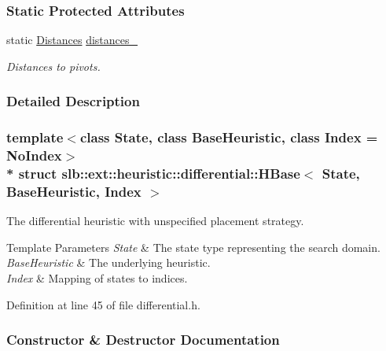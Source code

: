\subsubsection*{Static Protected Attributes}
\begin{DoxyCompactItemize}
\item 
static \hyperlink{structslb_1_1ext_1_1heuristic_1_1differential_1_1HBase_a616a127e34765bea6c069fc3faa4aafb}{Distances} \hyperlink{structslb_1_1ext_1_1heuristic_1_1differential_1_1HBase_a393a3a4cad2b4c0e4c16d41c97cc27c8}{distances\+\_\+}\hypertarget{structslb_1_1ext_1_1heuristic_1_1differential_1_1HBase_a393a3a4cad2b4c0e4c16d41c97cc27c8}{}\label{structslb_1_1ext_1_1heuristic_1_1differential_1_1HBase_a393a3a4cad2b4c0e4c16d41c97cc27c8}

\begin{DoxyCompactList}\small\item\em Distances to pivots. \end{DoxyCompactList}\end{DoxyCompactItemize}


\subsubsection{Detailed Description}
\subsubsection*{template$<$class State, class Base\+Heuristic, class Index = No\+Index$>$\\*
struct slb\+::ext\+::heuristic\+::differential\+::\+H\+Base$<$ State, Base\+Heuristic, Index $>$}

The differential heuristic with unspecified placement strategy. 


\begin{DoxyTemplParams}{Template Parameters}
{\em State} & The state type representing the search domain. \\
\hline
{\em Base\+Heuristic} & The underlying heuristic. \\
\hline
{\em Index} & Mapping of states to indices. \\
\hline
\end{DoxyTemplParams}


Definition at line 45 of file differential.\+h.



\subsubsection{Constructor \& Destructor Documentation}

